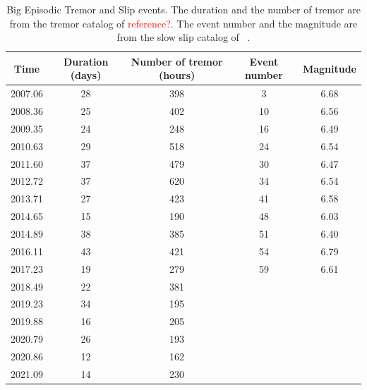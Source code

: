 \documentclass{article}
\begin{document}
\begin{table}[hbt!]
\caption{Big Episodic Tremor and Slip events. The duration and the number of tremor are from the tremor catalog of \textcolor{red}{reference?}. The event number and the magnitude are from the slow slip catalog of ~\citet{MIC_2019}.}
 \centering
 \begin{tabular}{c c c c c}
 \hline
 Time & Duration (days) & Number of tremor (hours) & Event number & Magnitude \\
 \hline
 2007.06 & 28 & 398 & 3 & 6.68 \\
 2008.36 & 25 & 402 & 10 & 6.56 \\
 2009.35 & 24 & 248 & 16 & 6.49 \\
 2010.63 & 29 & 518 & 24 & 6.54 \\
 2011.60 & 37 & 479 & 30 & 6.47 \\
 2012.72 & 37 & 620 & 34 & 6.54 \\
 2013.71 & 27 & 423 & 41 & 6.58 \\
 2014.65 & 15 & 190 & 48 & 6.03 \\
 2014.89 & 38 & 385 & 51 & 6.40 \\
 2016.11 & 43 & 421 & 54 & 6.79 \\
 2017.23 & 19 & 279 & 59 & 6.61 \\
 2018.49 & 22 & 381 & & \\
 2019.23 & 34 & 195 & & \\
 2019.88 & 16 & 205 & & \\
 2020.79 & 26 & 193 & & \\
 2020.86 & 12 & 162 & & \\
 2021.09 & 14 & 230 & & \\
 \hline
 \end{tabular}
 \end{table}
\end{document}
